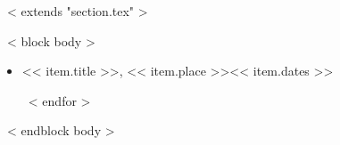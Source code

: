 ~< extends "section.tex" >~

~< block body >~
  \begin{itemize}
    ~< for item in items >~
      \item << item.title >>, << item.place >>\hfill << item.dates >>
        \iffalse
        \begin{itemize}
          ~< for detail in item.details ->~
            \item <<detail>>
          ~<- endfor ->~
        \end{itemize}
        \fi
    ~< endfor >~
  \end{itemize}
~< endblock body >~
